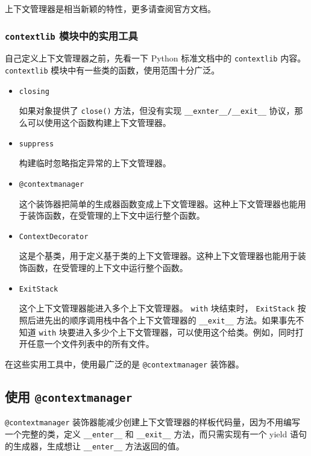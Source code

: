 上下文管理器是相当新颖的特性，更多请查阅官方文档。

\subsubsection{\texttt{contextlib} 模块中的实用工具}

自己定义上下文管理器之前，先看一下 Python 标准文档中的 \texttt{contextlib} 内容。 \texttt{contextlib} 模块中有一些类的函数，使用范围十分广泛。

\begin{itemize}
    \item \texttt{closing}
    
    如果对象提供了 \texttt{close()} 方法，但没有实现 \texttt{\_\_exnter\_\_/\_\_exit\_\_} 协议，那么可以使用这个函数构建上下文管理器。

    \item \texttt{suppress}
    
    构建临时忽略指定异常的上下文管理器。

    \item \texttt{@contextmanager}
    
    这个装饰器把简单的生成器函数变成上下文管理器。这种上下文管理器也能用于装饰函数，在受管理的上下文中运行整个函数。

    \item \texttt{ContextDecorator}
    
    这是个基类，用于定义基于类的上下文管理器。这种上下文管理器也能用于装饰函数，在受管理的上下文中运行整个函数。

    \item \texttt{ExitStack}
    
    这个上下文管理器能进入多个上下文管理器。 \texttt{with} 块结束时， \texttt{ExitStack} 按照后进先出的顺序调用栈中各个上下文管理器的 \texttt{\_\_exit\_\_} 方法。如果事先不知道 \texttt{with} 块要进入多少个上下文管理器，可以使用这个给类。例如，同时打开任意一个文件列表中的所有文件。
\end{itemize}

在这些实用工具中，使用最广泛的是 \texttt{@contextmanager} 装饰器。

\subsection{使用 \texttt{@contextmanager}}

\texttt{@contextmanager} 装饰器能减少创建上下文管理器的样板代码量，因为不用编写一个完整的类，定义 \texttt{\_\_enter\_\_} 和 \texttt{\_\_exit\_\_} 方法，而只需实现有一个 yield 语句的生成器，生成想让 \texttt{\_\_enter\_\_} 方法返回的值。

